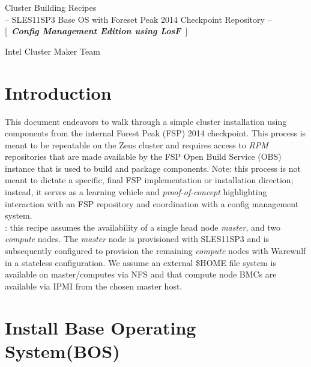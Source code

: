 \documentclass[letterpaper]{article}
\newcommand{\baseOS}{SLES11SP3}
\begin{document}
\thispagestyle{empty}



\begin{center}
\vspace*{-0.5cm}
{\Large Cluster Building Recipes} \\ \vspace*{0.2cm}
{\large -- \baseOS{} Base OS with Foreset Peak 2014 Checkpoint Repository -- } \\ \vspace{0.2cm}
{\large [~{\bf \em Config Management Edition using LosF}~]} \\ \vspace*{0.75cm}

{\large Intel Cluster Maker Team} \\
\end{center}



\section{Introduction}
This document endeavors to walk through a simple cluster installation using
components from the internal Forest Peak (FSP) 2014 checkpoint. This process is
meant to be repeatable on the Zeus cluster and requires access to {\em RPM}
repositories that are made available by the FSP Open Build Service (OBS)
instance that is used to build and package components. Note: this process is
not meant to dictate a specific, final FSP implementation or installation
direction; instead, it serves as a learning vehicle and {\em proof-of-concept}
highlighting interaction with an FSP repository and coordination with a config
management system. \\

: this recipe assumes the availability of a single head node
{\em master}, and two {\em compute} nodes. The {\em master} node is
provisioned with \baseOS{} and is subsequently configured to
provision the remaining {\em compute} nodes with Warewulf in a
stateless configuration. We assume an external \$HOME file system is
available on master/computes via NFS and that compute node BMCs are
available via IPMI from the chosen master host. \\




\section{Install Base Operating System(BOS)}
\end{document}
